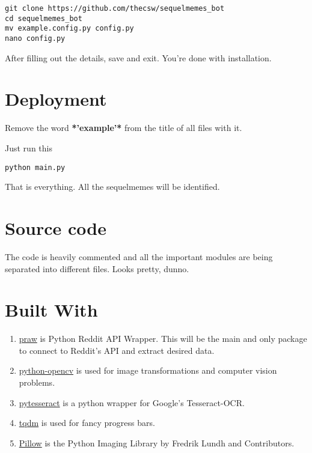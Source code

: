 \documentclass[11pt]{article}
\begin{document}
\begin{verbatim}
git clone https://github.com/thecsw/sequelmemes_bot
cd sequelmemes_bot
mv example.config.py config.py
nano config.py
\end{verbatim}

After filling out the details, save and exit. You're done with installation.

\section{Deployment}
\label{sec-3}

Remove the word \textbf{*'example'*} from the title of all files with it.

Just run this

\begin{verbatim}
python main.py
\end{verbatim}

That is everything. All the sequelmemes will be identified.
\section{Source code}
\label{sec-4}

The code is heavily commented and all the important modules are being separated into different files. Looks pretty, dunno.

\section{Built With}
\label{sec-5}
\begin{enumerate}
\item \href{https://github.com/praw-dev/praw}{praw} is Python Reddit API Wrapper. This will be the main and only package to
connect to Reddit's API and extract desired data.
\item \href{https://pypi.python.org/pypi/opencv-python}{python-opencv} is used for image transformations and computer vision problems.
\item \href{https://pypi.python.org/pypi/pytesseract}{pytesseract} is a python wrapper for Google's Tesseract-OCR.
\item \href{https://pypi.python.org/pypi/tqdm}{tqdm} is used for fancy progress bars.
\item \href{https://pillow.readthedocs.io/en/latest/}{Pillow} is the Python  Imaging Library by Fredrik Lundh and Contributors.
\end{enumerate}
\end{document}
